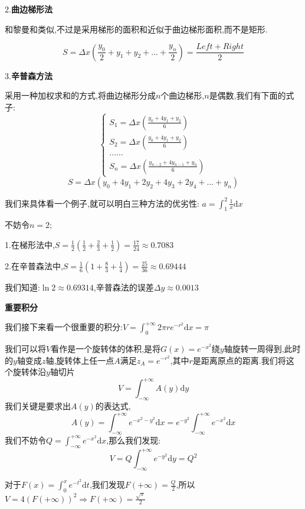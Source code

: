 \documentclass[oneside]{book}
\begin{document}
	2.\textbf{曲边梯形法}
	
	和黎曼和类似,不过是采用梯形的面积和近似于曲边梯形面积,而不是矩形.
	
	$$S=\Delta x(\frac{y_{0}}{2}+y_{1}+y_{2}+...+\frac{y_{n}}{2})=\frac{Left+Right}{2}$$
	
	3.\textbf{辛普森方法}
	
	采用一种加权求和的方式,将曲边梯形分成$n$个曲边梯形,$n$是偶数,我们有下面的式子:
	$$\left\{\begin{array}{c}
		S_{1}=\Delta x(\frac{y_{0}+4y_{1}+y_{2}}{6})\\S_{2}=\Delta x(\frac{y_{0}+4y_{1}+y_{2}}{6})\\......\\S_{n}=\Delta x(\frac{y_{n-2}+4y_{n-1}+y_{n}}{6})
	\end{array}\right.$$
	$$S=\Delta x(y_{0}+4y_{1}+2y_{2}+4y_{3}+2y_{4}+...+y_{n})$$
	
	我们来具体看一个例子,就可以明白三种方法的优劣性:
	$a=\int_{1}^{2}\frac{1}{x}\mathrm{d}x$
	
	不妨令$n=2$;
	
	1.在梯形法中,$S=\frac{1}{2}(\frac{1}{2}+\frac{2}{3}+\frac{1}{2})=\frac{17}{24}\approx 0.7083$
	
	2.在辛普森法中,$S=\frac{1}{6}(1+\frac{8}{3}+\frac{1}{4})=\frac{25}{36}\approx0.69444$
	
	我们知道:$\ln 2\approx 0.69314$,辛普森法的误差$\Delta y\approx 0.0013$
	
	\textbf{重要积分}
	
	我们接下来看一个很重要的积分:$V=\int_{0}^{+\infty}2\pi re^{-r^{2}}\mathrm{d}x=\pi$
	
	我们可以将$V$看作是一个旋转体的体积,是将$G(x)=e^{-x^{2}}$绕$y$轴旋转一周得到,此时的$y$轴变成$z$轴,旋转体上任一点$A$满足$z_{A}=e^{-r^{2}}$,其中$r$是距离原点的距离.我们将这个旋转体沿$y$轴切片$$V=\int_{-\infty}^{+\infty}A(y)\mathrm{d}y$$
	我们关键是要求出$A(y)$的表达式,$$A(y)=\int_{-\infty}^{+\infty}e^{-x^{2}-y^{2}}\mathrm{d}x=e^{-y^{2}}\int_{-\infty}^{+\infty}e^{-x^{2}}\mathrm{d}x$$
	我们不妨令$Q=\int_{-\infty}^{+\infty}e^{-x^{2}}\mathrm{d}x$,那么我们发现:
	$$V=Q\int_{-\infty}^{+\infty}e^{-y^{2}}\mathrm{d}y=Q^{2}$$
	
	对于$F(x)=\int_{0}^{x}e^{-t^{2}}\mathrm{d}t$,我们发现$F(+\infty)=\frac{Q}{2}$,所以$V=4(F(+\infty))^{2}\Rightarrow F(+\infty)=\frac{\sqrt{\pi}}{2}$
\end{document}
